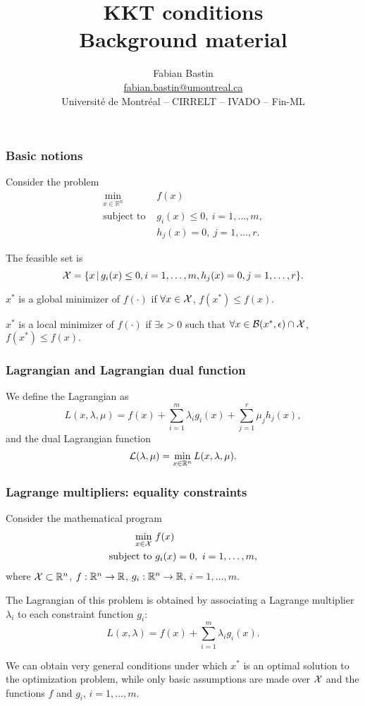 \documentclass[usepdftitle=false]{beamer}
\author[Fabian Bastin]{Fabian Bastin \\ \url{fabian.bastin@umontreal.ca} \\ Université de Montréal -- CIRRELT -- IVADO -- Fin-ML}
\date{}
\title[Linear programming]{KKT conditions\\Background material}
\def\red{\color{red}}
\begin{document}
\frame{\titlepage}


\begin{frame}
\frametitle{Basic notions}

Consider the problem
\begin{align*}
	\min_{x \in \mathbb{R}^n} \ & f(x) \\
	\mbox{subject to } & g_i(x) \leq 0,\ i = 1,\ldots,m, \\
	& h_j(x) = 0,\ j = 1,\ldots,r.
\end{align*}

The feasible set is
$$
{\mathcal{X}} = \{ x \,|\, g_i(x) \leq 0, i = 1,\ldots,m, h_j(x) = 0, j = 1,\ldots,r \}.
$$

$x^*$ is a global minimizer of $f(\cdot)$ if $\forall x \in {\mathcal{X}}$, $f(x^*) \leq f(x)$.

$x^*$ is a local minimizer of $f(\cdot)$ if
$\exists \epsilon > 0$ such that $\forall x \in {\mathcal{B}}(x^*, \epsilon) \cap {\mathcal{X}}$, $f(x^*) \leq f(x).$

\end{frame}

\begin{frame}
	\frametitle{Lagrangian and Lagrangian dual function}
	
We define the Lagrangian as
	$$
	L(x, \lambda, \mu) = f(x) + \sum_{i = 1}^m \lambda_i g_i(x)
	+ \sum_{j = 1}^r \mu_j h_j(x),
	$$
and the dual Lagrangian function
	$$
	{\mathcal{L}}(\lambda, \mu) = \min_{x \in \mathbb{R}^n} L(x, \lambda, \mu).
	$$
	
\end{frame}

\begin{frame}
\frametitle{Lagrange multipliers: equality constraints}

Consider the mathematical program
\begin{align*}
\min_{x \in {\mathcal{X}}} \ & f(x) \\
\mbox{subject to } & g_i(x) = 0,\ i = 1,\ldots,m,
\end{align*}
where ${\mathcal{X}} \subset {\mathbb{R}}^n$, $f: {\mathbb{R}}^n \rightarrow {\mathbb{R}}$, $g_i: {\mathbb{R}}^n \rightarrow {\mathbb{R}}$, $i = 1,\ldots,m$.

\mbox{}

The {\red Lagrangian} of this problem is obtained by associating a Lagrange multiplier  $\lambda_i$ to each constraint function $g_i$:
$$
L(x, \lambda) = f(x) + \sum_{i = 1}^{m} \lambda_i g_i(x).
$$

We can obtain very general conditions under which $x^*$ is an optimal solution to the optimization problem, while only basic assumptions are made over ${\mathcal{X}}$ and the functions $f$ and $g_i$, $i = 1,\ldots,m$.

\end{frame}
\end{document}

